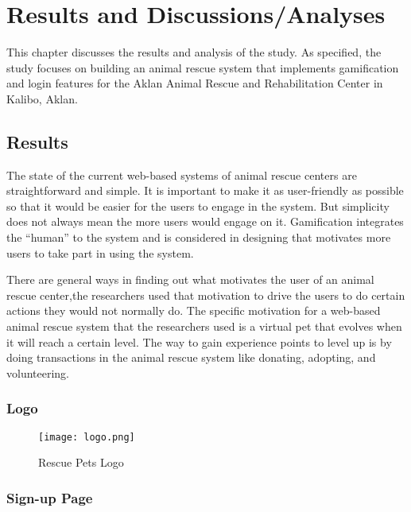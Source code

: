 \chapter{Results and Discussions/Analyses}
This chapter discusses the results and analysis of the study. As specified, the study focuses on building an animal rescue system that implements gamification and login features for the Aklan Animal Rescue and Rehabilitation Center in Kalibo, Aklan. 

\section{Results}

The state of the current web-based systems of animal rescue centers are straightforward
and simple. It is important to make it as user-friendly as possible so that
it would be easier for the users to engage in the system. But simplicity does
not always mean the more users would engage on it. Gamification integrates the
“human” to the system and is considered in designing that motivates more
users to take part in using the system.

There are general ways in finding out what motivates the user of an animal
rescue center,the researchers used that motivation to drive the users to do certain actions they would not normally do. The specific motivation for a web-based animal
rescue system that the researchers used is a virtual pet that evolves when it will reach a certain
level. The way to gain experience points to level up is by doing transactions in the animal rescue system like donating, adopting, and volunteering.

\subsection{Logo}
\begin{figure}[h]              
	\centering                    
	\texttt{[image: logo.png]}  
	\caption{Rescue Pets Logo}
	\label{fig:disneystock}
	
\end{figure}

\newpage
\subsection{Sign-up Page}

